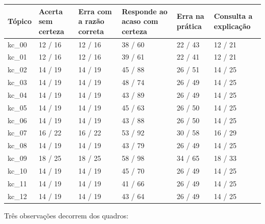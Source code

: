 \begin{quadro}[htbp]
\caption{Número de telas e de toques (telas / toques) por tópico, nos demais perfis, no ritmo completo}\label{qua:6-3}
\footnotesize
\begin{tabularx}{\textwidth}{|>{\centering\arraybackslash}p{1.7cm}|X|X|X|X|X|}
\hline
\textbf{Tópico} & \textbf{Acerta sem certeza} & \textbf{Erra com a razão correta} & \textbf{Responde ao acaso com certeza} & \textbf{Erra na prática} & \textbf{Consulta a explicação} \\ \hline
kc\_00 & 12 / 16 & 12 / 16 & 38 / 60 & 22 / 43 & 12 / 21 \\ \hline
kc\_01 & 12 / 16 & 12 / 16 & 39 / 61 & 22 / 41 & 12 / 21 \\ \hline
kc\_02 & 14 / 19 & 14 / 19 & 45 / 88 & 26 / 51 & 14 / 25 \\ \hline
kc\_03 & 14 / 19 & 14 / 19 & 48 / 74 & 26 / 49 & 14 / 25 \\ \hline
kc\_04 & 14 / 19 & 14 / 19 & 43 / 89 & 26 / 49 & 14 / 25 \\ \hline
kc\_05 & 14 / 19 & 14 / 19 & 45 / 63 & 26 / 50 & 14 / 25 \\ \hline
kc\_06 & 14 / 19 & 14 / 19 & 43 / 88 & 26 / 50 & 14 / 25 \\ \hline
kc\_07 & 16 / 22 & 16 / 22 & 53 / 92 & 30 / 58 & 16 / 29 \\ \hline
kc\_08 & 14 / 19 & 14 / 19 & 43 / 79 & 26 / 49 & 14 / 25 \\ \hline
kc\_09 & 18 / 25 & 18 / 25 & 58 / 98 & 34 / 65 & 18 / 33 \\ \hline
kc\_10 & 14 / 19 & 14 / 19 & 45 / 70 & 26 / 49 & 14 / 25 \\ \hline
kc\_11 & 14 / 19 & 14 / 19 & 41 / 66 & 26 / 49 & 14 / 25 \\ \hline
kc\_12 & 14 / 19 & 14 / 19 & 43 / 64 & 26 / 49 & 14 / 25 \\ \hline
\end{tabularx}
\end{quadro}

Três observações decorrem dos quadros:

